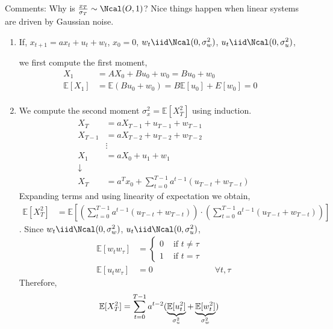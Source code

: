 \documentclass{article}[12pt]
\def \E{\mathbb E}
\begin{document}
	Comments:
	Why is $
	\frac{x_T}{\sigma_T} \sim \Ncal(O,1)
	$? Nice things happen when linear systems are driven by Gaussian noise.
	\begin{enumerate}
		\item 
		
		If,
		$x_{t+1} = ax_t + u_t + w_t$, 
		$x_0 = 0$, 
		$w_{t} \iid \Ncal(0, \sigma_w^2)$, 
		$u_{t} \iid \Ncal(0, \sigma_u^2) $, 
		
		we first compute the first moment, 
		\begin{align*}
		X_1 &= AX_0 + B u_0 + w_0 = Bu_0 + w_0 \\
		\E[X_1] &= \E(B u_0 + w_0 ) = B \E[u_0] + E[w_0]  = 0 &\\
		\end{align*}
		 
		
		\item We compute the second moment $\sigma_x^2 = \E[X_T^2]$ using induction.
		\begin{align*}
		X_{T} &= aX_{T-1} + u_{T-1} + w_{T-1} \\
		X_{T-1} &= aX_{T-2} + u_{T-2} + w_{T-2} \\
		&\vdots \\
		X_{1} &= aX_{0} + u_{1} + w_{1}\\
		\downarrow \\
		X_T &= a^Tx_0 + \sum_{t=0}^{T-1} a^{t-1}(u_{T-t}+ w_{T-t})
		\end{align*}
		Expanding terms and using linearity of expectation we obtain, 
		\begin{align*}
		\E[X_T^2] &= \E[(\sum_{t=0}^{T-1} a^{t-1}(u_{T-t}+ w_{T-t})) \cdot (\sum_{t=0}^{T-1} a^{t-1}(u_{T-t}+ w_{T-t}))]
		\end{align*}.
		Since $w_{t} \iid \Ncal(0, \sigma_w^2)$, $u_{t} \iid \Ncal(0, \sigma_u^2) $,
		\begin{align*}
		\E[w_t w_\tau] &= \begin{cases}
		0 & \text{ if $t \neq \tau$}\\
		1 & \text{ if $t = \tau$}
		\end{cases}\\
		\E[u_t w_\tau] & = 0 & \text{ $\forall t, \tau$}
		\end{align*}
		Therefore,
		\begin{align*}
		\E[X_T^2] &= \sum_{t=0}^{T-1}a^{t-2}(\underbrace{\E[u_t^2]}_{\normalfont \sigma_u^2} + 
		\underbrace{\E[w_t^2]}_{\normalfont \sigma_w^2})
		\end{align*}
		
		
	\end{enumerate}
\end{document}
